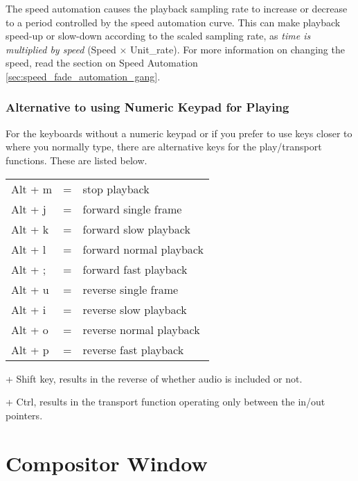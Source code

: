 The speed automation causes the playback sampling rate to increase or decrease to a period controlled by the speed automation curve.  
This can make playback speed-up or slow-down according to the scaled sampling rate, as \textit{time is multiplied by speed} (Speed $\times$ Unit\_rate). For more information on changing
the speed, read the section on Speed Automation \ref{sec:speed_fade_automation_gang}.

\subsubsection*{Alternative to using Numeric Keypad for Playing}%
\label{ssub:alternative_to_using_numeric_keypad_for_playing}


For the keyboards without a numeric keypad or if you prefer to use keys closer to where you normally type, there are alternative keys for the play/transport functions.  These are listed below.

\begin{tabular}{lcl}
	Alt + m&=&stop playback\\

	Alt + j&=&forward single frame\\

	Alt + k&=&forward slow playback\\

	Alt + l&=&forward normal playback\\

	Alt + ;&=&forward fast playback\\

	Alt + u&=&reverse single frame\\

	Alt + i&=&reverse slow playback\\

	Alt + o&=&reverse normal playback\\

	Alt + p&=&reverse fast playback\\
\end{tabular}
\begin{minipage}{.45\linewidth}
+ Shift key, results in the reverse of whether audio is included or not.
\vspace{1ex}

+ Ctrl, results in the transport function operating only between the in/out pointers.
\end{minipage}

\section{Compositor Window}%
\label{sec:compositor_window}

